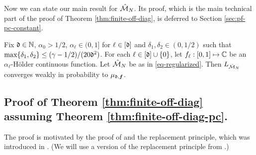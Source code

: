 \documentclass{amsart}
\numberwithin{equation}{section}
\def\corOZ{}
\newcommand{\abbr}[1]{{\sc\lowercase{#1}}}
\begin{document}
Now we can state our main result for $\hat {\mathcal{M}}_N$.
Its proof, which is the main technical part of the proof of
Theorem \ref{thm:finite-off-diag}, is deferred to
Section \ref{sec:pf-pc-constant}.
\begin{theorem}\label{thm:finite-off-diag-pc}
  Fix $\mathfrak{d} \in \mathbb N$, \corOZ{$\alpha_0>1/2$, $\alpha_\ell\in (0,1]$ for
    $\ell \in [\mathfrak{d}]$ and $\delta_1, \delta_2 \in (0,1/2)$ such that $\max\{\delta_1, \delta_2\} \le
  (\gamma - 1/2)/(20\mathfrak{d}^2)$.}
For  each $\ell \in [\mathfrak{d}]\cup\{0\}$, let $f_\ell: [0,1] \mapsto \mathbb{C}$ be an $\alpha_\ell$-H\"{o}lder continuous function.
Let $\hat {\mathcal{M}}_N$ be as in
\eqref{eq-regularized}.
Then $L_{\hat{\mathcal{M}}_N}$ converges weakly in probability to
$\mu_{\mathfrak{d}, {\bm f}}$.
\end{theorem}
\subsection{Proof of Theorem
\ref{thm:finite-off-diag} assuming
Theorem \ref{thm:finite-off-diag-pc}.} The proof
is motivated by the proof of \cite[Theorem 4, Theorem 5]{GWZ}
and the replacement principle, which was introduced in
\cite[Theorem 2.1]{TV-AM}. (We will use a version of the
replacement principle from \cite[Lemma 10.1]{BCZ}.)
\end{document}
